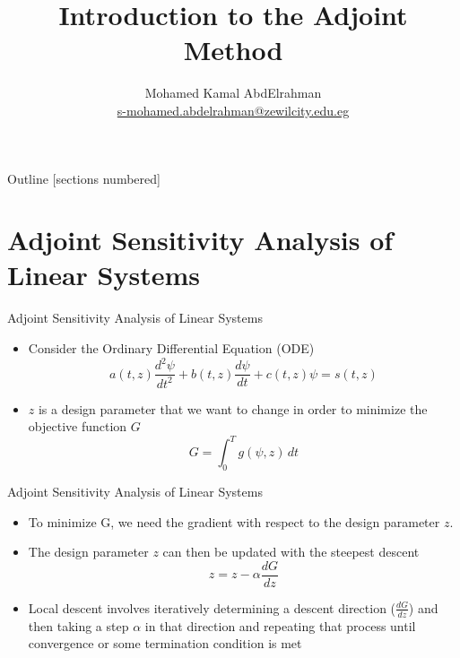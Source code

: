 \documentclass[10pt]{beamer}
\title{Introduction to the Adjoint Method}
\author{
	Mohamed Kamal AbdElrahman \\
 \href{my_email}{s-mohamed.abdelrahman@zewilcity.edu.eg}}
\institute{University of Science and Technology \\[10pt] Zewail City}
\date{}
\begin{document}
\begin{frame}
	\titlepage
\end{frame}
\begin{frame}{Outline}
	[sections numbered]
	\tableofcontents%
\end{frame}
\section{Adjoint Sensitivity Analysis of Linear Systems}
\begin{frame}{Adjoint Sensitivity Analysis of Linear Systems}
	\begin{itemize}
		\item  Consider the Ordinary Differential Equation (ODE)
		\begin{equation}
a(t,z)\frac{d^2 \psi}{dt^2} + b(t,z)\frac{d \psi}{dt} +c(t,z) \psi = s(t,z) 
		\end{equation}
\item $z$ is a design parameter that we want to change in order to minimize the objective function $G$
\begin{equation}
G = \int^{T}_0  g(\psi,z) \, dt
\end{equation}
	\end{itemize}
\end{frame}

\begin{frame}{Adjoint Sensitivity Analysis of Linear Systems}
	\begin{itemize}
	\item  To minimize G, we  need the gradient with respect to the design parameter $z$.
	
	\item The  design parameter $z$ can then be updated with the steepest descent 
	\begin{equation}
	z = z - \alpha \frac{dG}{dz}
	\end{equation}
	
	\item Local descent involves iteratively determining a descent direction ($ \frac{dG}{dz}$) and	then taking a step $\alpha$ in that direction and repeating that process until convergence or some termination condition is met
	\end{itemize}
\end{frame}
\end{document}
